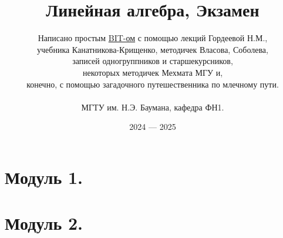 \documentclass[a4papper]{article}
\title{\Huge Линейная алгебра, Экзамен}
\author{
    Написано простым \href{https://t.me/Borislav_Timoshin}{BIT-ом} с помощью лекций Гордеевой Н.М., \\ 
    учебника Канатникова-Крищенко, методичек Власова, Соболева, \\
    записей одногруппников и старшекурсников,\\ некоторых методичек Мехмата МГУ и,\\ конечно, с помощью загадочного путешественника по млечному пути. \\
    \\
    МГТУ им. Н.Э. Баумана, кафедра ФН1.
}
\date{2024 — 2025}
\begin{document}
    \pagestyle{fancy}
    \fancyhead[L]{\thepage}

    \maketitle
        
    \tableofcontents

    \label{toc}

    \newpage

    \Hide
    
    \part{Модуль 1.}

    
    
    
    
    
    
    
    
    
    
    
    
    
    
    
    
    
    
    
    

    \part{Модуль 2.}

    
    
    
    
    
    
    
    
    
    
    
    
    
    
    
    
    
    
    
    
\end{document}
